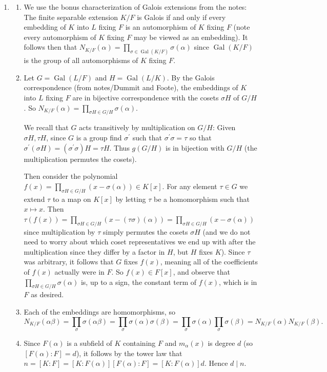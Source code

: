 \documentclass[11pt]{article}
\DeclareMathOperator{\Gal}{Gal}
\begin{document}
\begin{enumerate}
\begin{enumerate}
        Hence there are infinitely many primes $p$ such that $p\equiv 1\mod m$. \qed
    \end{enumerate}
    \item \phantom{*}
    \begin{enumerate}
        \item We use the bonus characterization of Galois extensions from the notes: The finite separable extension $K/F$ is Galois if and only if every embedding of $K$ into $L$ fixing $F$ is an automorphism of $K$ fixing $F$ (note every automorphism of $K$ fixing $F$ may be viewed as an embedding). It follows then that $N_{K/F}(\alpha) = \prod_{\sigma\in\Gal(K/F)}\sigma(\alpha)$ since $\Gal(K/F)$ is the group of all automorphisms of $K$ fixing $F$.
        \item Let $G = \Gal(L/F)$ and $H = \Gal(L/K)$. By the Galois correspondence (from notes/Dummit and Foote), the embeddings of $K$ into $L$ fixing $F$ are in bijective correspondence with the cosets $\sigma H$ of $G/H$. So $N_{K/F}(\alpha) = \prod_{\sigma H\in G/H}\sigma(\alpha)$. 
        
        We recall that $G$ acts transitively by multiplication on $G/H$: Given $\sigma H,\tau H$, since $G$ is a group find $\sigma^\prime$ such that $\sigma^\prime \sigma = \tau$ so that $\sigma^\prime(\sigma H) = (\sigma^\prime \sigma)H = \tau H$. Thus $g (G/H)$ is in bijection with $G/H$ (the multiplication permutes the cosets).
        
        Then consider the polynomial $f(x) = \prod_{\sigma H\in G/H}(x-\sigma(\alpha))\in K[x]$. For any element $\tau\in G$ we extend $\tau$ to a map on $K[x]$ by letting $\tau$ be a homomorphism such that $x\mapsto x$. Then $\tau(f(x)) = \prod_{\sigma H\in G/H}(x-(\tau\sigma)(\alpha)) = \prod_{\sigma H\in G/H}(x-\sigma(\alpha))$ since multiplication by $\tau$ simply permutes the cosets $\sigma H$ (and we do not need to worry about which coset representatives we end up with after the multiplication since they differ by a factor in $H$, but $H$ fixes $K$). Since $\tau$ was arbitrary, it follows that $G$ fixes $f(x)$, meaning all of the coefficients of $f(x)$ actually were in $F$. So $f(x)\in F[x]$, and observe that $\prod_{\sigma H\in G/H}\sigma(\alpha)$ is, up to a sign, the constant term of $f(x)$, which is in $F$ as desired.
        \item Each of the embeddings are homomorphisms, so \[N_{K/F}(\alpha\beta) = \prod_\sigma \sigma(\alpha\beta) = \prod_\sigma \sigma(\alpha)\sigma(\beta) = \prod_\sigma \sigma(\alpha)\prod_\sigma \sigma(\beta) = N_{K/F}(\alpha)N_{K/F}(\beta).\]
        \item Since $F(\alpha)$ is a subfield of $K$ containing $F$ and $m_\alpha(x)$ is degree $d$ (so $[F(\alpha)\colon F] = d$), it follows by the tower law that $n = [K\colon F] = [K\colon F(\alpha)][F(\alpha)\colon F] = [K\colon F(\alpha)]d$. Hence $d\mid n$.
        

\end{enumerate}
\end{enumerate}
\end{document}
